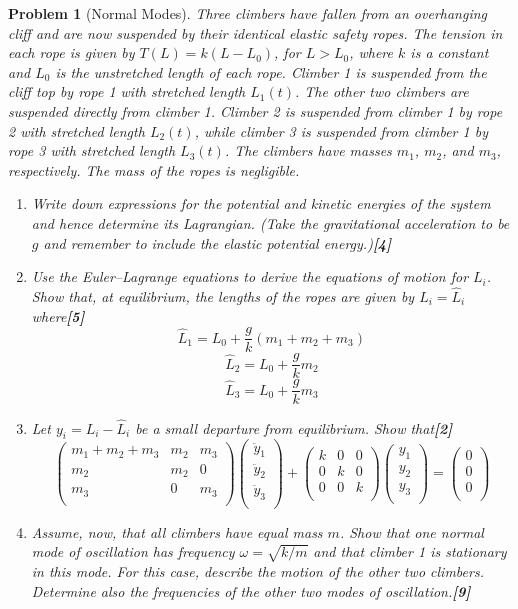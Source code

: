 \documentclass[a4paper]{article}
\theoremstyle{new}
\newtheorem{qns}{Problem}[section]
\begin{document}
\begin{qns}[Normal Modes]
Three climbers have fallen from an overhanging cliff and are now suspended by their identical elastic safety ropes. The tension in each rope is given by $T(L) = k(L − L_0)$, for $L > L_0$, where $k$ is a constant and $L_0$ is the unstretched length of each rope. Climber 1 is suspended from the cliff top by rope 1 with stretched length $L_1(t)$. The other two climbers are suspended directly from climber 1. Climber 2 is suspended from climber 1 by rope 2 with stretched length $L_2(t)$, while climber 3 is suspended from climber 1 by rope 3 with stretched length $L_3(t)$. The climbers have masses $m_1$, $m_2$, and $m_3$, respectively. The mass of the ropes is negligible.
\begin{enumerate}[label=(\alph*)]
\item Write down expressions for the potential and kinetic energies of the system and hence determine its Lagrangian. (Take the gravitational acceleration to be $g$ and remember to include the elastic potential energy.)\hfill\textbf{[4]}
\item Use the Euler–Lagrange equations to derive the equations of motion for $L_i$. Show that, at equilibrium, the lengths of the ropes are given by $L_i = \hat{L}_i$ where\hfill\textbf{[5]}
$$\hat{L}_1=L_0+\frac{g}{k}(m_1+m_2+m_3)$$
$$\hat{L}_2=L_0+\frac{g}{k}m_2$$
$$\hat{L}_3=L_0+\frac{g}{k}m_3$$
\item Let $y_i=L_i-\hat{L}_i$ be a small departure from equilibrium. Show that\hfill\textbf{[2]}
$$\begin{pmatrix}m_1+m_2+m_3&m_2&m_3\\m_2&m_2&0\\m_3&0&m_3\\\end{pmatrix}\begin{pmatrix}\ddot{y}_1\\\ddot{y}_2\\\ddot{y}_3\\\end{pmatrix}+\begin{pmatrix}k&0&0\\0&k&0\\0&0&k\\\end{pmatrix}\begin{pmatrix}y_1\\y_2\\y_3\\\end{pmatrix}=\begin{pmatrix}0\\0\\0\\\end{pmatrix}$$
\item Assume, now, that all climbers have equal mass $m$. Show that one normal mode of oscillation has frequency $\omega=\sqrt{k/m}$ and that climber 1 is stationary in this mode. For this case, describe the motion of the other two climbers. Determine also the frequencies of the other two modes of oscillation.\hfill\textbf{[9]}
\end{enumerate}
\end{qns}
\end{document}
